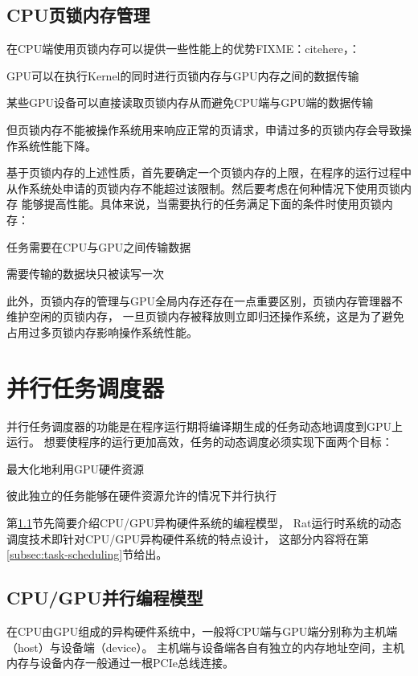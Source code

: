 \subsection{CPU页锁内存管理}
在CPU端使用页锁内存可以提供一些性能上的优势FIXME：citehere，：
\begin{compactitem}
  \item GPU可以在执行Kernel的同时进行页锁内存与GPU内存之间的数据传输
  \item 某些GPU设备可以直接读取页锁内存从而避免CPU端与GPU端的数据传输
\end{compactitem}
但页锁内存不能被操作系统用来响应正常的页请求，申请过多的页锁内存会导致操作系统性能下降。

基于页锁内存的上述性质，首先要确定一个页锁内存的上限，在程序的运行过程中
从作系统处申请的页锁内存不能超过该限制。然后要考虑在何种情况下使用页锁内存
能够提高性能。具体来说，当需要执行的任务满足下面的条件时使用页锁内存：
\begin{compactitem}
  \item 任务需要在CPU与GPU之间传输数据
  \item 需要传输的数据块只被读写一次
\end{compactitem}

此外，页锁内存的管理与GPU全局内存还存在一点重要区别，页锁内存管理器不维护空闲的页锁内存，
一旦页锁内存被释放则立即归还操作系统，这是为了避免占用过多页锁内存影响操作系统性能。

\section{并行任务调度器}\label{sec:task-scheduler}
并行任务调度器的功能是在程序运行期将编译期生成的任务动态地调度到GPU上运行。
想要使程序的运行更加高效，任务的动态调度必须实现下面两个目标：
\begin{compactitem}
  \item 最大化地利用GPU硬件资源
  \item 彼此独立的任务能够在硬件资源允许的情况下并行执行
\end{compactitem}

第\ref{cpu-gpu-model}节先简要介绍CPU/GPU异构硬件系统的编程模型，
Rat运行时系统的动态调度技术即针对CPU/GPU异构硬件系统的特点设计，
这部分内容将在第\ref{subsec:task-scheduling}节给出。

\subsection{CPU/GPU并行编程模型}\label{cpu-gpu-model}
在CPU由GPU组成的异构硬件系统中，一般将CPU端与GPU端分别称为主机端（host）与设备端（device）。
主机端与设备端各自有独立的内存地址空间，主机内存与设备内存一般通过一根PCIe总线连接。

